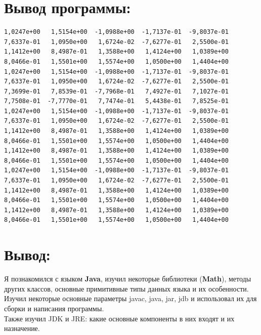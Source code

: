 \documentclass[11pt]{article}
\begin{document}
\section{Вывод программы:}
\label{sec:org7f283e3}
\fontsize{6}{8} \selectfont
\begin{verbatim}
1,0247e+00   1,5154e+00  -1,0988e+00  -1,7137e-01  -9,8037e-01   7,6337e-01   1,0950e+00   1,6724e-02  -7,6277e-01   2,5500e-01
1,1412e+00   8,4987e-01   1,3588e+00   1,4124e+00   1,0389e+00   8,0466e-01   1,5501e+00   1,5574e+00   1,0500e+00   1,4404e+00
1,0247e+00   1,5154e+00  -1,0988e+00  -1,7137e-01  -9,8037e-01   7,6337e-01   1,0950e+00   1,6724e-02  -7,6277e-01   2,5500e-01
7,3699e-01   7,8539e-01  -7,7968e-01   7,4927e-01   7,1027e-01   7,7508e-01  -7,7770e-01   7,7474e-01   5,4438e-01   7,8525e-01
1,0247e+00   1,5154e+00  -1,0988e+00  -1,7137e-01  -9,8037e-01   7,6337e-01   1,0950e+00   1,6724e-02  -7,6277e-01   2,5500e-01
1,1412e+00   8,4987e-01   1,3588e+00   1,4124e+00   1,0389e+00   8,0466e-01   1,5501e+00   1,5574e+00   1,0500e+00   1,4404e+00
1,1412e+00   8,4987e-01   1,3588e+00   1,4124e+00   1,0389e+00   8,0466e-01   1,5501e+00   1,5574e+00   1,0500e+00   1,4404e+00
1,0247e+00   1,5154e+00  -1,0988e+00  -1,7137e-01  -9,8037e-01   7,6337e-01   1,0950e+00   1,6724e-02  -7,6277e-01   2,5500e-01
1,1412e+00   8,4987e-01   1,3588e+00   1,4124e+00   1,0389e+00   8,0466e-01   1,5501e+00   1,5574e+00   1,0500e+00   1,4404e+00
1,1412e+00   8,4987e-01   1,3588e+00   1,4124e+00   1,0389e+00   8,0466e-01   1,5501e+00   1,5574e+00   1,0500e+00   1,4404e+00
\end{verbatim}
\large
\section{Вывод:}
\label{sec:org170612b}
Я познакомился с языком \textbf{Java}, изучил некоторые библиотеки (\textbf{Math}), методы других классов, основные примитивные типы данных языка и их особенности. \\
Изучил некоторые основные параметры javac, java, jar, jdb и использовал их для сборки и написания программы. \\
Также изучил JDK и JRE: какие основные компоненты в них входят и их назначение.
\end{document}

